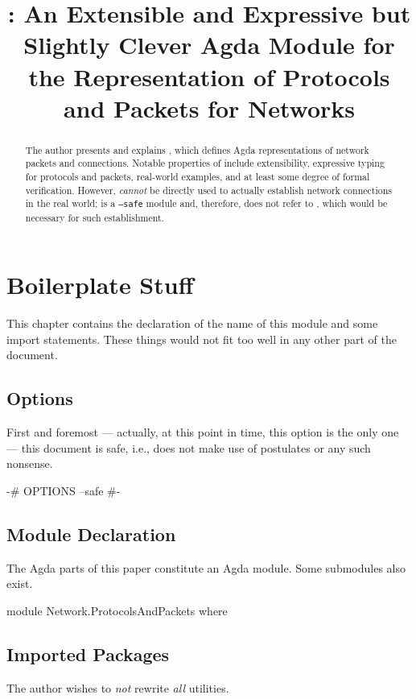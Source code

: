 \documentclass{report}
\title{\AgdaModule{Network.ProtocolsAndPackets}: An Extensible and Expressive but Slightly Clever Agda Module for the Representation of Protocols and Packets for Networks}
\begin{document}
\maketitle{}

\begin{abstract}
The author presents and explains , which defines Agda representations of network packets and connections.  Notable properties of  include extensibility, expressive typing for protocols and packets, real-world examples, and at least some degree of formal verification.  However,  \emph{cannot} be directly used to actually establish network connections in the real world;  is a \texttt{--safe} module and, therefore, does not refer to , which would be necessary for such establishment.
\end{abstract}

\chapter{Boilerplate Stuff}
This chapter contains the declaration of the name of this module and some import statements.  These things would not fit too well in any other part of the document.

\section{Options}
First and foremost --- actually, at this point in time, this option is the only one --- this document is safe, i.e., does not make use of postulates or any such nonsense.

\begin{code}
{-# OPTIONS --safe #-}
\end{code}

\section{Module Declaration}
The Agda parts of this paper constitute an Agda module.  Some submodules also exist.

\begin{code}
module Network.ProtocolsAndPackets where
\end{code}

\section{Imported Packages}
The author wishes to \emph{not} rewrite \emph{all} utilities.
\end{document}
